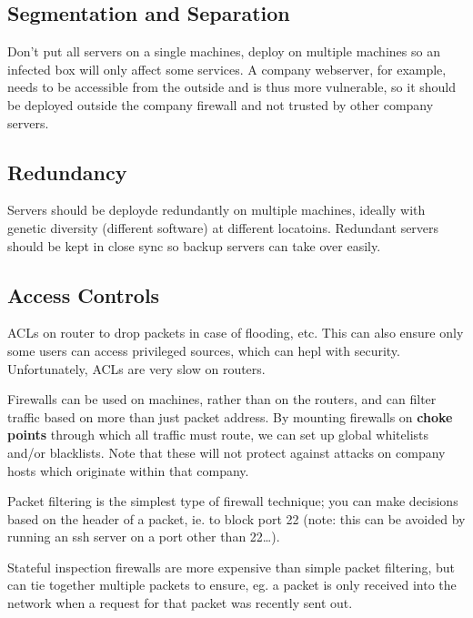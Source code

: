 \documentclass[12pt]{article}
\begin{document}
\subsection{Segmentation and Separation}
Don't put all servers on a single machines, deploy on multiple machines so an infected box will only affect some services. A company webserver, for example, needs to be accessible from the outside and is thus more vulnerable, so it should be deployed outside the company firewall and not trusted by other company servers.

\subsection{Redundancy}
Servers should be deployde redundantly on multiple machines, ideally with genetic diversity (different software) at different locatoins. Redundant servers should be kept in close sync so backup servers can take over easily.

\subsection{Access Controls}
ACLs on router to drop packets in case of flooding, etc. This can also ensure only some users can access privileged sources, which can hepl with security. Unfortunately, ACLs are very slow on routers.

Firewalls can be used on machines, rather than on the routers, and can filter traffic based on more than just packet address. By mounting firewalls on {\bf choke points} through which all traffic must route, we can set up global whitelists and/or blacklists. Note that these will not protect against attacks on company hosts which originate within that company.

Packet filtering is the simplest type of firewall technique; you can make decisions based on the header of a packet, ie. to block port 22 (note: this can be avoided by running an ssh server on a port other than 22\dots).

Stateful inspection firewalls are more expensive than simple packet filtering, but can tie together multiple packets to ensure, eg. a packet is only received into the network when a request for that packet was recently sent out.
\end{document}
